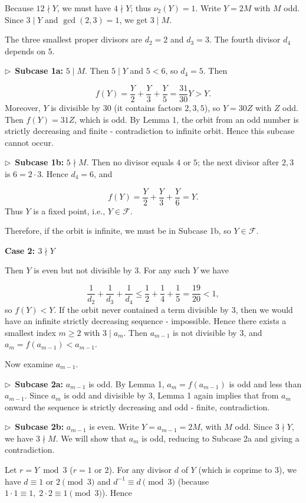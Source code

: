 \documentclass{llmxive}
\providecommand{\solutionheading}[1]{\par\smallskip\noindent\textbf{#1}\par}
\providecommand{\compactbullet}[1]{\par\noindent$\triangleright$~#1\par}
\begin{document}
Because \(12\nmid Y\), we must have \(4\nmid Y\); thus \(\nu_2(Y)=1\). Write \(Y=2M\) with \(M\) odd. Since \(3\mid Y\) and \(\gcd(2,3)=1\), we get \(3\mid M\).\par
The three smallest proper divisors are \(d_2=2\) and \(d_3=3\). The fourth divisor \(d_4\) depends on \(5\).\par
\compactbullet{\textbf{Subcase 1a:} \(5\mid M\). Then \(5\mid Y\) and \(5<6\), so \(d_4=5\). Then}
\[
f(Y)=\frac{Y}{2}+\frac{Y}{3}+\frac{Y}{5}=\frac{31}{30}Y>Y.
\]
Moreover, \(Y\) is divisible by \(30\) (it contains factors \(2,3,5\)), so \(Y=30Z\) with \(Z\) odd. Then \(f(Y)=31Z\), which is odd. By Lemma 1, the orbit from an odd number is strictly decreasing and finite - contradiction to infinite orbit. Hence this subcase cannot occur.\par
\compactbullet{\textbf{Subcase 1b:} \(5\nmid M\). Then no divisor equals \(4\) or \(5\); the next divisor after \(2,3\) is \(6=2\cdot3\). Hence \(d_4=6\), and}
\[
f(Y)=\frac{Y}{2}+\frac{Y}{3}+\frac{Y}{6}=Y.
\]
Thus \(Y\) is a fixed point, i.e., \(Y\in\mathcal{F}\).\par
Therefore, if the orbit is infinite, we must be in Subcase 1b, so \(Y\in\mathcal{F}\).\par
\solutionheading{Case 2: \(3\nmid Y\)}
Then \(Y\) is even but not divisible by \(3\). For any such \(Y\) we have\par
\[
\frac{1}{d_2}+\frac{1}{d_3}+\frac{1}{d_4}\le\frac{1}{2}+\frac{1}{4}+\frac{1}{5}=\frac{19}{20}<1,
\]
so \(f(Y)<Y\). If the orbit never contained a term divisible by \(3\), then we would have an infinite strictly decreasing sequence - impossible. Hence there exists a smallest index \(m\ge2\) with \(3\mid a_m\). Then \(a_{m-1}\) is not divisible by \(3\), and \(a_m=f(a_{m-1})<a_{m-1}\).\par
Now examine \(a_{m-1}\).\par
\compactbullet{\textbf{Subcase 2a:} \(a_{m-1}\) is odd. By Lemma 1, \(a_m=f(a_{m-1})\) is odd and less than \(a_{m-1}\). Since \(a_m\) is odd and divisible by \(3\), Lemma 1 again implies that from \(a_m\) onward the sequence is strictly decreasing and odd - finite, contradiction.}
\compactbullet{\textbf{Subcase 2b:} \(a_{m-1}\) is even. Write \(Y=a_{m-1}=2M\), with \(M\) odd. Since \(3\nmid Y\), we have \(3\nmid M\). We will show that \(a_m\) is odd, reducing to Subcase 2a and giving a contradiction.}
Let \(r=Y\bmod 3\) (\(r=1\) or \(2\)). For any divisor \(d\) of \(Y\) (which is coprime to \(3\)), we have \(d\equiv1\) or \(2\pmod3\) and \(d^{-1}\equiv d\pmod3\) (because \(1\cdot1\equiv1,\;2\cdot2\equiv1\pmod3\)). Hence\par
\end{document}
